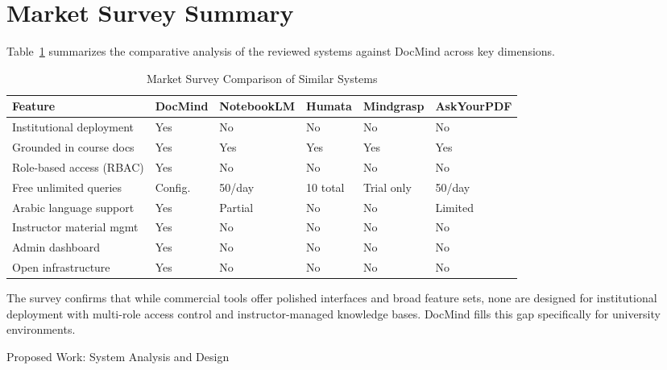 \documentclass[12pt, a4paper, oneside]{report}
\makeatletter
\newcommand{\chapformat}[1]{%
  \centering
  {\fontsize{14}{17}\selectfont\itshape\addfontfeatures{LetterSpace=3.5}%
    \MakeUppercase{\chaptertitlename}\ \thechapter}\\[24pt]%
  {\fontsize{16}{19}\selectfont\bfseries\addfontfeatures{LetterSpace=0}%
    \MakeUppercase{#1}}%
}
\newcommand{\chapformatstar}[1]{%
  \centering
  {\fontsize{16}{19}\selectfont\bfseries\MakeUppercase{#1}}%
}
\newcommand{\chapterstar}[1]{%
  \clearpage
  \phantomsection
  \edef\@saved@chapcount{\the\value{chapter}}%
  \titleformat{\chapter}[block]{}{}%
    {0pt}{\chapformatstar}%
  \@originalchapter*{#1}%
  \setcounter{chapter}{\@saved@chapcount}%
  \titleformat{\chapter}[block]{}{}%
    {0pt}{\chapformat}%
}
\let\@originalchapter\chapter
\renewcommand{\chapter}{%
  \@ifstar{\chapterstar}{\@originalchapter}%
}
\let\oldsection\section
\renewcommand{\section}{%
  \addtocontents{toc}{\protect\needspace{4\baselineskip}}%
  \oldsection
}
\makeatother
\begin{document}
\newpage
\section{Market Survey Summary}

Table~\ref{tab:market_survey} summarizes the comparative analysis of the reviewed systems against DocMind across key dimensions.

\begin{table}[H]
\centering
\caption{Market Survey Comparison of Similar Systems}
\label{tab:market_survey}
\begin{adjustbox}{max width=\textwidth}
\begin{tabular}{p{2.8cm} p{2.45cm} p{2.45cm} p{2.45cm} p{2.45cm} p{2.45cm}}
\toprule
\textbf{Feature} & \textbf{DocMind} & \textbf{NotebookLM} & \textbf{Humata} & \textbf{Mindgrasp} & \textbf{AskYourPDF} \\
\midrule
Institutional deployment & Yes & No & No & No & No \\
Grounded in course docs  & Yes & Yes & Yes & Yes & Yes \\
Role-based access (RBAC) & Yes & No  & No  & No  & No  \\
Free unlimited queries   & Config. & 50/day & 10 total & Trial only & 50/day \\
Arabic language support  & Yes & Partial & No & No & Limited \\
Instructor material mgmt & Yes & No  & No  & No  & No  \\
Admin dashboard          & Yes & No  & No  & No  & No  \\
Open infrastructure      & Yes & No  & No  & No  & No  \\
\bottomrule
\end{tabular}
\end{adjustbox}
\end{table}

The survey confirms that while commercial tools offer polished interfaces and broad feature sets, none are designed for institutional deployment with multi-role access control and instructor-managed knowledge bases. DocMind fills this gap specifically for university environments.

\chapter{Proposed Work: System Analysis and Design}
\end{document}
